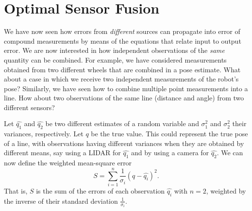 \section{Optimal Sensor Fusion}


We have now seen how errors from \emph{different} sources can propagate into error of compound measurements by means of the equations that relate input to output error. We are now interested in how independent observations of the \emph{same} quantity can be combined. For example, we have considered measurements obtained from two different wheels that are combined in a pose estimate. What about a case in which we receive two independent measurements of the robot's pose? Similarly, we have seen how to combine multiple point measurements into a line. How about two observations of the same line (distance and angle) from two different sensors? 

Let $ \hat{q_1}$ and $ \hat{q_2}$ be two different estimates of a random variable and $ \sigma^2_1$ and $ \sigma^2_2$ their variances, respectively. Let $ q$ be the true value. This could represent the true pose of a line, with observations having different variances when they are obtained by different means, say using a LIDAR for $ \hat{q_1}$ and by using a camera for $ \hat{q_2}$. We can now define the weighted mean-square error
 \begin{equation}
S=\displaystyle\sum_{i=1}^{n}\frac{1}{\sigma_i} (q-\hat{q_i})^2 .
\end{equation}
That is, $ S$ is the sum of the errors of each observation $ \hat{q_i}$ with $n=2$, weighted by the inverse of their standard deviation $ \frac{1}{\sigma_i}$. 

